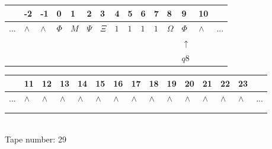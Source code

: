 \documentclass[11pt]{article}
\begin{document}
\begin{table}[H]
\centering
\begin{tabular}{lllllllllllllll}
 & -2 & -1 & 0 & 1 & 2 & 3 & 4 & 5 & 6 & 7 & 8 & 9 & 10 & \\
\hline
$...$ & \multicolumn{1}{|l|}{$\wedge$} & \multicolumn{1}{|l|}{$\wedge$} & \multicolumn{1}{|l|}{$\Phi$} & \multicolumn{1}{|l|}{$M$} & \multicolumn{1}{|l|}{$\Psi$} & \multicolumn{1}{|l|}{$\Xi$} & \multicolumn{1}{|l|}{$1$} & \multicolumn{1}{|l|}{$1$} & \multicolumn{1}{|l|}{$1$} & \multicolumn{1}{|l|}{$1$} & \multicolumn{1}{|l|}{$\Omega$} & \multicolumn{1}{|l|}{$\Phi$} & \multicolumn{1}{|l|}{$\wedge$} & $...$\\
\hline
&  &  &  &  &  &  &  &  &  &  &  & $\uparrow$ &  &  \\
&  &  &  &  &  &  &  &  &  &  &  & $ q8 $ &  &  \\
\end{tabular}
\begin{tabular}{lllllllllllllll}
 & 11 & 12 & 13 & 14 & 15 & 16 & 17 & 18 & 19 & 20 & 21 & 22 & 23 & \\
\hline
$...$ & \multicolumn{1}{|l|}{$\wedge$} & \multicolumn{1}{|l|}{$\wedge$} & \multicolumn{1}{|l|}{$\wedge$} & \multicolumn{1}{|l|}{$\wedge$} & \multicolumn{1}{|l|}{$\wedge$} & \multicolumn{1}{|l|}{$\wedge$} & \multicolumn{1}{|l|}{$\wedge$} & \multicolumn{1}{|l|}{$\wedge$} & \multicolumn{1}{|l|}{$\wedge$} & \multicolumn{1}{|l|}{$\wedge$} & \multicolumn{1}{|l|}{$\wedge$} & \multicolumn{1}{|l|}{$\wedge$} & \multicolumn{1}{|l|}{$\wedge$} & $...$\\
\hline
&  &  &  &  &  &  &  &  &  &  &  &  &  &  \\
&  &  &  &  &  &  &  &  &  &  &  &  &  &  \\
\end{tabular}
\\
Tape number: 29
\noindent\makebox[\linewidth]{\hdashrule{\textwidth}{1pt}{1pt}}\end{table}
\end{document}
